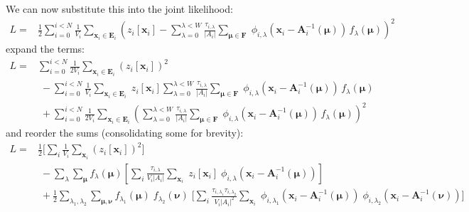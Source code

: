 \documentclass[DM,authoryear,toc]{lsstdoc}
\begin{document}
We can now substitute this into the joint likelihood:
\begin{align}
L = &
    \frac{1}{2} \sum_{i=0}^{i<N}
        \frac{1}{V_i}
        \sum_{\bm{x}_i \in \bm{E}_i}
        \left(
            z_i[\bm{x}_i]
            - \sum_{\lambda=0}^{\lambda < W}
                \frac{\tau_{i,\lambda}}{|A_i|}
                \sum_{\bm{\mu} \in \bm{F}}
                        \;\phi_{i,\lambda}\!\left(
                            \bm{x}_i - \bm{A}_i^{-1}(\bm{\mu})
                        \right)
                        \, f_{\lambda}(\bm{\mu})
        \right)^2
\end{align}
expand the terms:
\begin{align}
L =&
        \sum_{i=0}^{i<N}
        \frac{1}{2V_i}
        \sum_{\bm{x}_i \in \bm{E}_i}
        \left(z_i[\bm{x}_i]\right)^2
\nonumber\\
&\;-
    \sum_{i=0}^{i<N}
        \frac{1}{V_i}
        \sum_{\bm{x}_i \in \bm{E}_i}
        \; z_i[\bm{x}_i]
        \sum_{\lambda=0}^{\lambda < W}
            \frac{\tau_{i,\lambda}}{|A_i|}
            \sum_{\bm{\mu} \in \bm{F}}
                    \;\phi_{i,\lambda}\!\left(
                        \bm{x}_i - \bm{A}_i^{-1}(\bm{\mu})
                    \right)
                    \, f_{\lambda}(\bm{\mu})
\nonumber\\
&\;+
    \sum_{i=0}^{i<N}
        \frac{1}{2V_i}
        \sum_{\bm{x}_i \in \bm{E}_i}
        \left(
            \sum_{\lambda=0}^{\lambda < W}
                \frac{\tau_{i,\lambda}}{|A_i|}
                \sum_{\bm{\mu} \in \bm{F}}
                        \;\phi_{i,\lambda}\!\left(
                            \bm{x}_i - \bm{A}_i^{-1}(\bm{\mu})
                        \right)
                        \, f_{\lambda}(\bm{\mu})
        \right)^2
\end{align}
and reorder the sums (consolidating some for brevity):
\begin{align}
L =&
    \frac{1}{2}
        \Bigg[
            \sum_{i}
            \frac{1}{V_i}
            \sum_{\bm{x}_i}
            \left(z_i[\bm{x}_i]\right)^2
        \Bigg]
    \nonumber\\
&\; -
    \sum_{\lambda}
    \sum_{\bm{\mu}}
    f_{\lambda}(\bm{\mu})
    \left[
        \sum_{i}
        \frac{\tau_{i,\lambda}}{V_i|A_i|}
        \sum_{\bm{x}_i}
            \; z_i[\bm{x}_i]
            \; \phi_{i,\lambda}\!\left(
                \bm{x}_i - \bm{A}_i^{-1}(\bm{\mu})
            \right)
    \right]
    \nonumber\\
&\; +
    \frac{1}{2}
        \sum_{\lambda_1,\lambda_2}
        \sum_{\bm{\mu},\bm{\nu}}
        f_{\lambda_1}(\bm{\mu}) \;
        f_{\lambda_2}(\bm{\nu}) \;
        \Bigg[
        \sum_{i}
            \frac{
                \tau_{i,\lambda_1}
                \tau_{i,\lambda_2}
            }{
                V_i |A_i|^2
            }
            \sum_{\bm{x}_i}
            \; \phi_{i,\lambda_1}\!\left(
                    \bm{x}_i - \bm{A}_i^{-1}(\bm{\mu})
            \right)
            \; \phi_{i,\lambda_2}\!\left(
                \bm{x}_i - \bm{A}_i^{-1}(\bm{\nu})
            \right)
        \Bigg]
\end{align}
\end{document}
